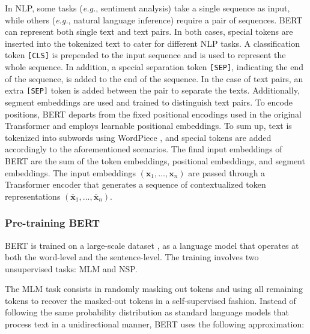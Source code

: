 
In \ac{NLP}, some tasks (\textit{e.g.}, sentiment analysis) take a single sequence as input, while others (\textit{e.g.}, natural language inference) require a pair of sequences. \ac{BERT} can represent both single text and text pairs. In both cases, special tokens are inserted into the tokenized text to cater for different \ac{NLP} tasks. A classification token \texttt{[CLS]} is prepended to the input sequence and is used to represent the whole sequence. In addition, a special separation token \texttt{[SEP]}, indicating the end of the sequence, is added to the end of the sequence. In the case of text pairs, an extra \texttt{[SEP]} token is added between the pair to separate the texts. Additionally, segment embeddings are used and trained to distinguish text pairs. To encode positions, \ac{BERT} departs from the fixed positional encodings used in the original Transformer and employs learnable positional embeddings. To sum up, text is tokenized into subwords using WordPiece \citep{wu2016google}, and special tokens are added accordingly to the aforementioned scenarios. The final input embeddings of \ac{BERT} are the sum of the token embeddings, positional embeddings, and segment embeddings. The input embeddings $(\bm{x}_1, \ldots, \bm{x}_n)$ are passed through a Transformer encoder that generates a sequence of contextualized token representations $(\overline{\bm{x}}_1, \ldots, \overline{\bm{x}}_n)$.

\subsubsection{Pre-training BERT}

\ac{BERT} is trained on a large-scale dataset \citep{zhu2015aligning}, as a language model that operates at both the word-level and the sentence-level. The training involves two unsupervised tasks: \ac{MLM} and \ac{NSP}. 

The \ac{MLM} task consists in randomly masking out tokens and using all remaining tokens to recover the masked-out tokens in a self-supervised fashion. Instead of following the same probability distribution as standard language models that process text in a unidirectional manner, \ac{BERT} uses the following approximation:

